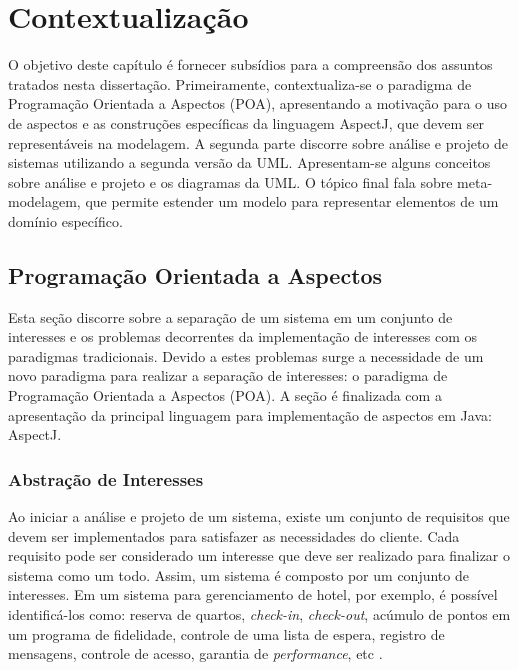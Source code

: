 \chapter{Contextualização}

O objetivo deste capítulo é fornecer subsídios para a compreensão dos assuntos tratados nesta dissertação. Primeiramente, contextualiza-se o paradigma
de Programação Orientada a Aspectos (POA), apresentando a motivação para o uso de aspectos e as construções específicas da linguagem AspectJ, que devem ser representáveis 
na modelagem. A segunda parte discorre sobre análise e projeto de sistemas utilizando a segunda versão da UML. Apresentam-se alguns conceitos sobre
análise e projeto e os diagramas da UML. O tópico final fala sobre meta-modelagem, que permite estender um modelo para representar elementos de um
domínio específico.

\section{Programação Orientada a Aspectos}

Esta seção discorre sobre a separação de um sistema em um conjunto de interesses e os problemas decorrentes da implementação de interesses com os
paradigmas tradicionais. Devido a estes problemas surge a necessidade de um novo paradigma para realizar a separação de interesses: o paradigma de
Programação Orientada a Aspectos (POA). A seção é finalizada com a apresentação da principal linguagem para implementação de aspectos em Java: 
AspectJ.

\subsection{Abstração de Interesses}\label{sec:concerns_abstraction}

Ao iniciar a análise e projeto de um sistema, existe um conjunto de requisitos que devem ser implementados para satisfazer as necessidades do cliente.
Cada requisito pode ser considerado um interesse que deve ser realizado para finalizar o sistema como um todo. Assim, um sistema é composto por um
conjunto de interesses. Em um sistema para gerenciamento de hotel, por exemplo, é possível identificá-los como: reserva de quartos, \textit{check-in},
\textit{check-out}, acúmulo de pontos em um programa de fidelidade, controle de uma lista de espera, registro de mensagens, controle de acesso,
garantia de \textit{performance}, etc \cite{Jacobson:2004:ASD:1062430}.

